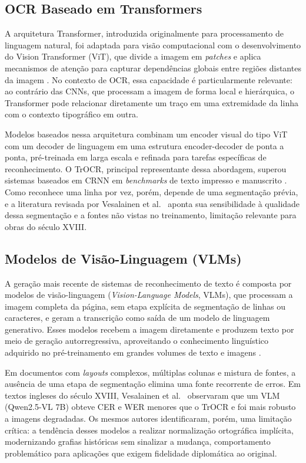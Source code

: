 \documentclass[noabntexcite,oneside]{ufsc-thesis-rn46-2019}
\begin{document}
\subsection{OCR Baseado em Transformers}

A arquitetura Transformer, introduzida originalmente para processamento de linguagem
natural, foi adaptada para visão computacional com o desenvolvimento do Vision Transformer
(ViT), que divide a imagem em \textit{patches} e aplica mecanismos de atenção para capturar
dependências globais entre regiões distantes da imagem \cite{vaswani2017,dosovitskiy2021}. No contexto de
OCR, essa capacidade é particularmente relevante: ao contrário das CNNs, que processam a
imagem de forma local e hierárquica, o Transformer pode relacionar diretamente um traço
em uma extremidade da linha com o contexto tipográfico em outra.

Modelos baseados nessa arquitetura combinam um encoder visual do tipo ViT com um decoder
de linguagem em uma estrutura encoder-decoder de ponta a ponta, pré-treinada em larga
escala e refinada para tarefas específicas de reconhecimento. O TrOCR, principal
representante dessa abordagem, superou sistemas baseados em CRNN em \textit{benchmarks}
de texto impresso e manuscrito \cite{huang2021}. Como reconhece uma linha por vez, porém,
depende de uma segmentação prévia, e a literatura revisada por Vesalainen et al.\
\cite{vesalainen2025} aponta sua sensibilidade à qualidade dessa segmentação e a fontes
não vistas no treinamento, limitação relevante para obras do século XVIII.

\subsection{Modelos de Visão-Linguagem (VLMs)}

A geração mais recente de sistemas de reconhecimento de texto é composta por modelos de
visão-linguagem (\textit{Vision-Language Models}, VLMs), que processam a imagem completa
da página, sem etapa explícita de segmentação de linhas ou caracteres, e geram a
transcrição como saída de um modelo de linguagem generativo. Esses modelos recebem a
imagem diretamente e produzem texto por meio de geração autorregressiva, aproveitando o
conhecimento linguístico adquirido no pré-treinamento em grandes volumes de texto e
imagens \cite{qwen2025vl}.

Em documentos com \textit{layouts} complexos, múltiplas colunas e mistura de fontes, a
ausência de uma etapa de segmentação elimina uma fonte recorrente de erros. Em textos
ingleses do século XVIII, Vesalainen et al.\ \cite{vesalainen2025} observaram que um VLM
(Qwen2.5-VL 7B) obteve CER e WER menores que o TrOCR e foi mais robusto a imagens
degradadas. Os mesmos autores identificaram, porém, uma limitação crítica: a tendência
desses modelos a realizar normalização ortográfica implícita, modernizando grafias
históricas sem sinalizar a mudança, comportamento problemático para aplicações que exigem
fidelidade diplomática ao original.
\end{document}
